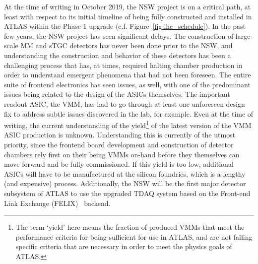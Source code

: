 %
%

At the time of writing in October 2019, the NSW project is on a critical path, at least with respect to its initial timeline of
being fully constructed and installed in ATLAS within the Phase 1 upgrade (c.f. Figure~\ref{fig:lhc_schedule}).
In the past few years, the NSW project has seen significant delays.
The construction of large-scale MM and sTGC detectors has never been done prior to the NSW, and
understanding the construction and behavior of these detectors has been a challenging process
that has, at times, required halting chamber production in order to understand emergent phenomena
that had not been foreseen.
The entire suite of frontend electronics has seen issues, as well, with one of the predominant issues being related to the
design of the ASICs themselves.
The important readout ASIC, the VMM, has had to go through at least one unforeseen design fix to address subtle
issues discovered in the lab, for example.
Even at the time of writing, the current understanding of the yield\footnote{The term `yield' here means
the fraction of produced VMMs that meet the performance criteria for being sufficient for use in ATLAS, and are not
failing specific criteria that are necessary in order to meet the physics goals of ATLAS.}
of the latest version of the VMM ASIC production is unknown.
Understanding this is currently of the utmost priority, since the frontend board development and construction of
detector chambers rely first on their being VMMs on-hand before they themselves can move forward and be fully commissioned.
If this yield is too low, additional ASICs will have to be manufactured at the silicon foundries, which is a lengthy (and expensive) process.
Additionally, the NSW will be the first major detector subsystem of ATLAS to use the upgraded TDAQ system based
on the Front-end Link Exchange (FELIX)~\cite{FELIX} backend.
